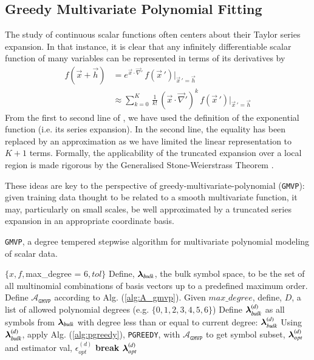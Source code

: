 \documentclass[twocolumn,aps,prd,floatfix,preprintnumbers,a4paper,nofootinbib,
superscriptaddress,10pt]{revtex4-1}
\def\gmvp#1{greedy-multivariate-polynomial#1
  (\texttt{GMVP}#1)\gdef\gmvp{\texttt{GMVP}}}
\def\pgreedy{\texttt{PGREEDY}}
\begin{document}
\subsection{Greedy Multivariate Polynomial Fitting}
%
The study of continuous scalar functions often centers about their Taylor series expansion.
%
In that instance, it is clear that any infinitely differentiable scalar function of many variables can be represented in terms of its derivatives by
%
\begin{align}
  \label{eq:mvt}
  f( \vec{x} + \vec{h} ) &= e^{ \vec{x} \cdot \vec{\nabla}' } \, f(\vec{x}\,') |_{\vec{x}\,'=\vec{h}}
  \\ \nonumber
  &\approx \sum_{k=0}^{K} \, \frac{1}{k!} \, (\vec{x} \cdot \vec{\nabla}')^{k} \, f(\vec{x}\,') |_{\vec{x}\,'=\vec{h}}
\end{align}
%
From the first to second line of , we have used the definition of the exponential function (i.e. its series expansion).
%
In the second line, the equality has been replaced by an approximation as we have limited the linear representation to $K+1$ terms.
%
Formally, the applicability of the truncated expansion over a local region is made rigorous by the Generalised Stone-Weierstrass Theorem \cite{Hassani:2013}.
%
\par These ideas are key to the perspective of \gmvp{}:
%
given training data thought to be related to a smooth multivariate function, it may, particularly on small scales, be well approximated by a truncated series expansion in an appropriate coordinate basis.
%
%
\hspace{1cm}
{\scriptsize
\begin{algorithm}[H]
  \caption{\gmvp{}, a degree tempered stepwise algorithm for multivariate polynomial modeling of scalar data.}
  \label{alg:gmvp}
  \begin{algorithmic}[1]
     $ \{ x, f, $max\_degree = 6$, tol \}$
    \vskip 10pt
    \State Define, ${\bm{\lambda}}_{bulk}$, the bulk symbol space, to be the set of all multinomial combinations of basis vectors up to a predefined maximum order.
    \State Define $\mathcal{A}_{\gmvp{}}$ according to Alg. (\ref{alg:A_gmvp}).
    \State Given $max\_degree$, define, ${ D}$, a list of allowed polynomial degrees (e.g. $\{0,1,2,3,4,5,6\}$)
      \State Define ${\bm{\lambda}}_{bulk}^{(d)}$ as all symbols from ${\bm{\lambda}}_{bulk}$ with degree less than or equal to current degree: ${\bm{\lambda}}^{(d)}_{bulk}$
      \State Using ${\bm{\lambda}}_{bulk}^{(d)}$, apply Alg. (\ref{alg:pgreedy}), \pgreedy{}, with $\mathcal{A}_{\gmvp{}}$ to get symbol subset, ${\bm{\lambda}}^{(d)}_{opt}$ and estimator val, $\epsilon^{(d)}_{opt}$
        \State \textbf{break}
      \EndIf
    \EndFor
    \vskip 10pt
     ${\bm{\lambda}}^{(d)}_{opt}$
  \end{algorithmic}
\end{algorithm}
}
\end{document}
